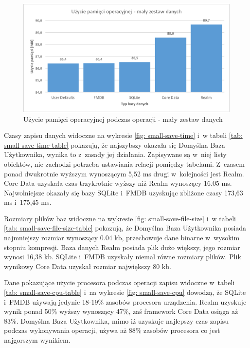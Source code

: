 \begin{figure}[h]
\centering
	\includegraphics[width=15cm]{img/save_data/save_ram_small.png}
	\caption{Użycie pamięci operacyjnej podczas operacji - mały zestaw danych}
	\label{fig: small-save-ram}
\end{figure}

\newpage

Czasy zapisu danych widoczne na wykresie \ref{fig: small-save-time} i~w tabeli \ref{tab: small-save-time-table} pokazują, że najszybszy okazała się Domyślna Baza Użytkownika, wynika to z~zasady jej działania. Zapisywane są w~niej listy obiektów, nie zachodzi potrzeba ustawiania relacji pomiędzy tabelami. Z~czasem ponad dwukrotnie wyższym wynoszącym 5,52 ms drugi w~kolejności jest Realm. Core Data uzyskała czas trzykrotnie wyższy niż Realm wynoszący 16.05 ms. Najwolniejsze okazały się bazy SQLite i~FMDB uzyskując zbliżone czasy 173,63 ms i~175,45 ms. \par 

Rozmiary plików baz widoczne na wykresie \ref{fig: small-save-file-size} i~w tabeli \ref{tab: small-save-file-size-table} pokazują, że Domyślna Baza Użytkownika posiada najmniejszy rozmiar wynoszący 0.04 kb, przechowuje dane binarne w~wysokim stopniu kompresji. Baza danych Realm posiada plik dużo większy, jego rozmiar wynosi 16,38 kb. SQLite i~FMDB uzyskały niemal równe rozmiary plików. Plik wynikowy Core Data uzyskał rozmiar największy 80 kb. \par

Dane pokazujące użycie procesora podczas operacji zapisu widoczne w~tabeli \ref{tab: small-save-cpu-table} i~na wykresie \ref{fig: small-save-cpu} dowodzą, że SQLite i~FMDB używają jedynie 18-19\% zasobów procesora urządzenia. Realm uzyskuje wynik ponad 50\% wyższy wynoszący 47\%, zaś framework Core Data osiąga aż 83\%. Domyślna Baza Użytkownika, mimo iż uzyskuje najlepszy czas zapisu podczas wykonywania operacji, używa aż 88\% zasobów procesora co jest najgorszym wynikiem.\par 

